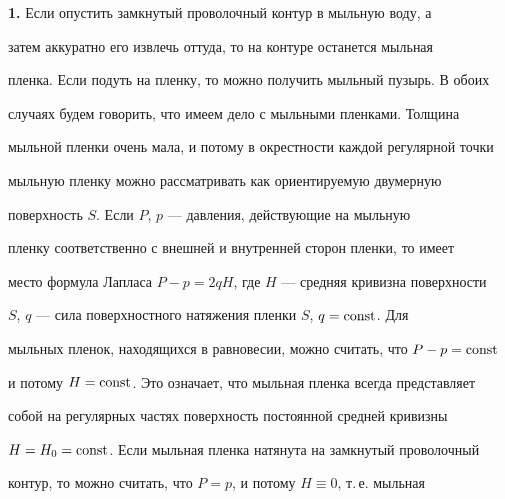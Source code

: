 

\pagestyle{plain} %


 




\maketitle 


\label{begin} 


 


 


 


 


 


{\bf 1.} Если опустить замкнутый проволочный контур в мыльную воду, а 


затем аккуратно его извлечь оттуда, то на контуре останется мыльная 


пленка. Если подуть на пленку, то можно получить мыльный пузырь. В обоих 


случаях будем говорить, что имеем дело с мыльными пленками. Толщина 


мыльной пленки очень мала, и потому в окрестности каждой регулярной точки 


мыльную пленку можно рассматривать как ориентируемую двумерную 


поверхность $S$. Если $P$, $p$ --- давления, действующие на мыльную 


пленку соответственно с внешней и внутренней сторон пленки, то имеет 


место формула Лапласа $P-p=2qH$, где $H$ --- средняя кривизна поверхности 


$S$, $q$ --- сила поверхностного натяжения пленки $S$, $q=\operatorname{const}$. Для 


мыльных пленок, находящихся в равновесии, можно считать, что $P-p=\operatorname{const}$ 


и потому $H=\operatorname{const}$. Это означает, что мыльная пленка всегда представляет 


собой на регулярных частях поверхность постоянной средней кривизны 


$H=H_0=\operatorname{const}$. Если мыльная пленка натянута на замкнутый проволочный 


контур, то можно считать, что $P=p$, и потому $H\equiv0$, т.\,е. мыльная 


